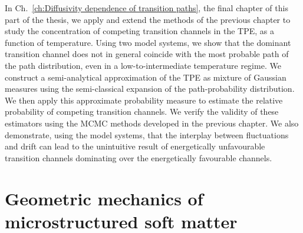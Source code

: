 \documentclass[]{cam-thesis}
\begin{document}
In Ch.~\ref{ch:Diffusivity dependence of transition paths}, the final chapter of this part of the thesis, we apply and extend the methods of the previous chapter to study the concentration of competing transition channels in the TPE, as a function of temperature. Using two model systems, we show that the dominant transition channel does not in general coincide with the most probable path of the path distribution, even in a low-to-intermediate temperature regime. We construct a semi-analytical approximation of the TPE as mixture of Gaussian measures using the semi-classical expansion of the path-probability distribution. We then apply this approximate probability measure to estimate the relative probability of competing transition channels. We verify the validity of these estimators using the MCMC methods developed in the previous chapter. We also demonstrate, using the model systems, that the interplay between fluctuations and drift can lead to the unintuitive result of energetically unfavourable transition channels dominating over the energetically favourable channels.

\section*{\large Geometric mechanics of microstructured soft matter}
\end{document}
